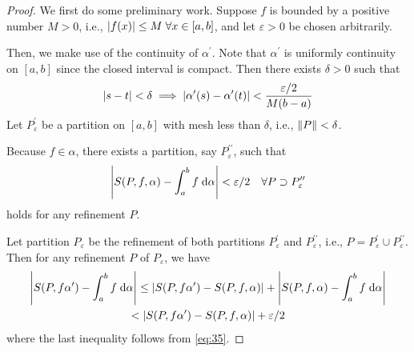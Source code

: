 \documentclass[thmcnt=section, 12pt]{my-elegantbook}
\begin{document}
\begin{proof}
    We first do some preliminary work. Suppose $f$ is bounded by a positive number $M > 0$, i.e., $\left\lvert f(x) \right\rvert \leq M \; \forall x \in [a, b]$, and let $\varepsilon > 0$ be chosen arbitrarily. 

    \par Then, we make use of the continuity of $\alpha^\prime$. Note that $\alpha^\prime$ is uniformly continuity on $[a, b]$ since the closed interval is compact. Then there exists $\delta > 0$ such that 
    \begin{align}
        \left\lvert s-t \right\rvert < \delta
        \implies \left\lvert \alpha^\prime(s) - \alpha^\prime(t) \right\rvert < \frac{\varepsilon / 2}{M(b-a)}
        \label{eq:34}
    \end{align}
    Let $P_\varepsilon^\prime$ be a partition on $[a, b]$ with mesh less than $\delta$, i.e., $\left\lVert P \right\rVert < \delta$.

    \par Because $f \in \mathfrak{\alpha}$, there exists a partition, say $P_\varepsilon^{\prime\prime}$, such that 
    \begin{align}
        \left\lvert S(P,f,\alpha) - \int_{a}^{b} f \; \mathrm{d}\alpha \right\rvert < \varepsilon / 2
        \quad \forall P \supset P_\varepsilon^{\prime\prime}
        \label{eq:35}
    \end{align}
    holds for any refinement $P$.

    Let partition $P_\varepsilon$ be the refinement of both partitions $P_\varepsilon^\prime$ and $P_\varepsilon^{\prime\prime}$, i.e., $P = P_\varepsilon^\prime \cup P_\varepsilon^{\prime\prime}$. Then for any refinement $P$ of $P_\varepsilon$, we have 
    \begin{multline}
        \left\lvert S(P, f\alpha^\prime) - \int_{a}^{b}f \; \mathrm{d}\alpha \right\rvert
        \leq \left\lvert S(P, f\alpha^\prime) - S(P, f, \alpha) \right\rvert 
            + \left\lvert S(P, f, \alpha) - \int_{a}^{b}f \; \mathrm{d}\alpha \right\rvert \\
        < \left\lvert S(P, f\alpha^\prime) - S(P, f, \alpha) \right\rvert + \varepsilon / 2
        \label{eq:36}
    \end{multline}
    where the last inequality follows from \eqref{eq:35}. 


\end{proof}
\end{document}
